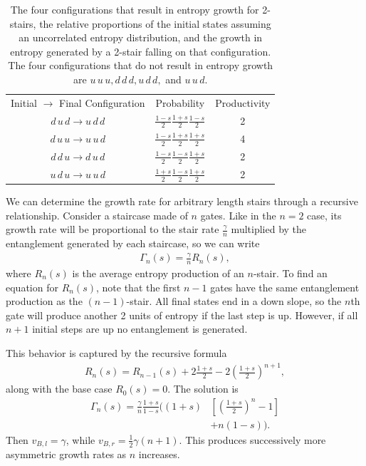 \documentclass[aps,prx,reprint,superscriptaddress, longbibliography]{revtex4-1}
\newcommand{\half}{\frac{1}{2}}
\begin{document}
\begin{table}
	\centering
	\begin{tabular}{ccc}
		Initial $\to$ Final 
		Configuration        & Probability         & Productivity\\
		$d\,u\,d\to u\,d\,d$ & $\frac{1-s}{2}\frac{1+s}{2}\frac{1-s}{2}$ & 2\\
		$d\,u\,u\to u\,u\,d$ & $\frac{1-s}{2}\frac{1+s}{2}\frac{1+s}{2}$ & 4\\
		$d\,d\,u\to d\,u\,d$ & $\frac{1-s}{2}\frac{1-s}{2}\frac{1+s}{2}$ & 2\\
		$u\,d\,u\to u\,u\,d$ & $\frac{1+s}{2}\frac{1-s}{2}\frac{1+s}{2}$ & 2
	\end{tabular}
	\caption{The four configurations that result in entropy growth for 2-stairs, the relative proportions of the initial states assuming an uncorrelated entropy distribution, and the growth in entropy generated by a 2-stair falling on that configuration. The four configurations that do not result in entropy growth are $u\,u\,u, d\,d\,d, u\,d\,d,$ and $u\,u\,d$.}
	\label{tab:2stair}
\end{table}

We can determine the growth rate for arbitrary length stairs through a recursive relationship. Consider a staircase made of $n$ gates. Like in the $n=2$ case, its growth rate will be proportional to the stair rate $\frac{\gamma}{n}$ multiplied by the entanglement generated by each staircase, so we can write
\begin{align}
\Gamma_n(s) = \frac{\gamma}{n}R_n(s), \label{eqn:growthrate}
\end{align}
where $R_n(s)$ is the average entropy production of an $n$-stair. To find an equation for $R_n(s)$, note that the first $n-1$ gates have the same entanglement production as the $(n-1)$-stair. All final states end in a down slope, so the $n$th gate will produce another 2 units of entropy if the last step is up. However, if all $n+1$ initial steps are up no entanglement is generated. 

This behavior is captured by the recursive formula
\begin{align}
R_n(s) = R_{n-1}(s)+2\frac{1+s}{2} - 2\left(\frac{1+s}{2}\right)^{n+1}, \label{eqn:raterecur}
\end{align}
along with the base case $R_0(s)=0$. The solution is
\begin{align}
\Gamma_n(s) = \frac{\gamma}{n}\frac{1+s}{1-s}\bigg(
(1+s)&\left[\left(\frac{1+s}{2}\right)^n-1\right]\nonumber \\
&+n(1-s)\bigg). \label{eqn:growthrate}
\end{align}
Then $v_{B,l}=\gamma$, while $v_{B,r}=\half\gamma(n+1)$.
This produces successively more asymmetric growth rates as $n$ increases. 
\end{document}
